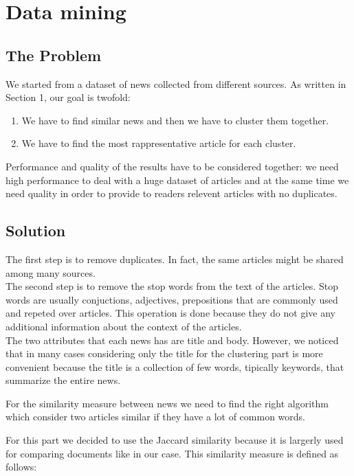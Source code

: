 \documentclass{acm_proc_article-sp}
\begin{document}
\section{Data mining}
\vspace{2mm}
\subsection{The Problem}
\vspace{2mm}
We started from a dataset of news collected from different sources. As written in Section 1, our goal is twofold:
\begin{enumerate}
\item We have to find similar news and then we have to cluster them together.
\item We have to find the most rappresentative article for each cluster.
\end{enumerate}
Performance and quality of the results have to be considered together: we need high performance to deal with a huge dataset of articles and at the same time we need quality in order to provide to readers relevent articles with no duplicates.
\subsection{Solution}
\vspace{2mm}
The first step is to remove duplicates. In fact, the same articles might be shared among many sources.\\
The second step is to remove the stop words from the text of the articles. Stop words are usually conjuctions, adjectives, prepositions that are commonly used and repeted over articles. This operation is done because they do not give any additional information about the context of the articles.\\

The two attributes that each news has are title and body. However, we noticed that in many cases considering only the title for the clustering part is more convenient because the title is a collection of few words, tipically keywords, that summarize the entire news.

For the similarity measure between news we need to find the right algorithm which consider two articles similar if they have a lot of common words.

For this part we decided to use the Jaccard similarity because it is largerly used for comparing documents like in our case. This similarity measure is defined as follows:
\end{document}
